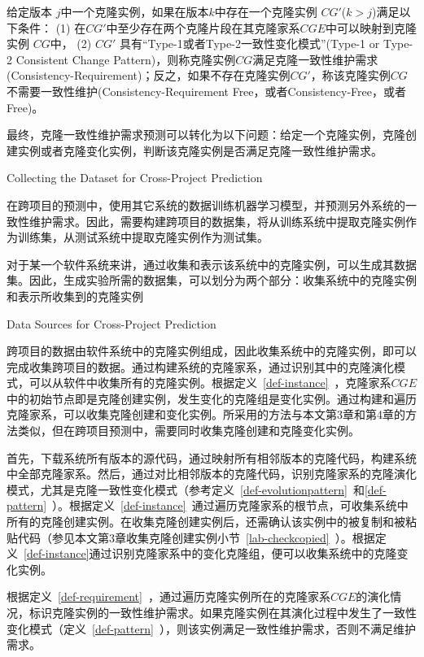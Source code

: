 \begin{definition}[克隆一致性维护需求] 
 \label{def-requirement}
给定版本 $j$中一个克隆实例，如果在版本$k$中存在一个克隆实例 $CG'$($k>j$)满足以下条件： (1) 在$CG'$中至少存在两个克隆片段在其克隆家系$CGE$中可以映射到克隆实例 $CG$中， (2) $CG'$ 具有“Type-1或者Type-2一致性变化模式”(Type-1 or Type-2 Consistent Change Pattern)，则称克隆实例$CG$满足克隆一致性维护需求(Consistency-Requirement)；反之，如果不存在克隆实例$CG'$，称该克隆实例$CG$不需要一致性维护(Consistency-Requirement Free，或者Consistency-Free，或者Free)。
\end{definition}

最终，克隆一致性维护需求预测可以转化为以下问题：给定一个克隆实例，克隆创建实例或者克隆变化实例，判断该克隆实例是否满足克隆一致性维护需求。

{Collecting the Dataset for Cross-Project Prediction}

在跨项目的预测中，使用其它系统的数据训练机器学习模型，并预测另外系统的一致性维护需求。因此，需要构建跨项目的数据集，将从训练系统中提取克隆实例作为训练集，从测试系统中提取克隆实例作为测试集。

对于某一个软件系统来讲，通过收集和表示该系统中的克隆实例，可以生成其数据集。因此，生成实验所需的数据集，可以划分为两个部分：收集系统中的克隆实例和表示所收集到的克隆实例

{Data Sources for Cross-Project Prediction}

跨项目的数据由软件系统中的克隆实例组成，因此收集系统中的克隆实例，即可以完成收集跨项目的数据。通过构建系统的克隆家系，通过识别其中的克隆演化模式，可以从软件中收集所有的克隆实例。根据定义~\ref{def-instance}~，克隆家系$CGE$中的初始节点即是克隆创建实例，发生变化的克隆组是变化实例。通过构建和遍历克隆家系，可以收集克隆创建和变化实例。所采用的方法与本文第3章和第4章的方法类似，但在跨项目预测中，需要同时收集克隆创建和克隆变化实例。

首先，下载系统所有版本的源代码，通过映射所有相邻版本的克隆代码，构建系统中全部克隆家系。然后，通过对比相邻版本的克隆代码，识别克隆家系的克隆演化模式，尤其是克隆一致性变化模式（参考定义~\ref{def-evolutionpattern}~和\ref{def-pattern}~）。根据定义~\ref{def-instance}~通过遍历克隆家系的根节点，可收集系统中所有的克隆创建实例。在收集克隆创建实例后，还需确认该实例中的被复制和被粘贴代码（参见本文第3章收集克隆创建实例小节~\ref{lab-checkcopied}~）。根据定义~\ref{def-instance}通过识别克隆家系中的变化克隆组，便可以收集系统中的克隆变化实例。

根据定义~\ref{def-requirement}~，通过遍历克隆实例所在的克隆家系$CGE$的演化情况，标识克隆实例的一致性维护需求。如果克隆实例在其演化过程中发生了一致性变化模式（定义~\ref{def-pattern}~），则该实例满足一致性维护需求，否则不满足维护需求。

